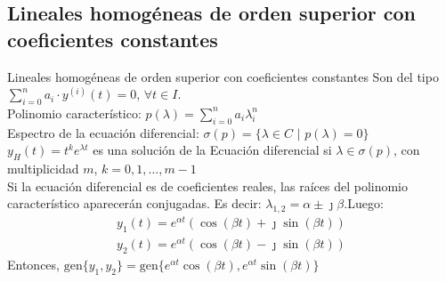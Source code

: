 \documentclass[a4paper, twoside]{article}
\numberwithin{equation}{section}
\numberwithin{figure}{section}
\numberwithin{table}{section}
\begin{document}
\subsection{Lineales homogéneas de orden superior con coeficientes constantes}
\begin{definicion*}{Lineales homogéneas de orden superior con coeficientes constantes}
	Son del tipo $\sum_{i=0}^n a_i \cdot y^{(i)}(t)=0$, $\forall t \in I$.\\
	
	Polinomio característico: $p(\lambda)=\sum_{i=0}^n a_i \lambda_i^n$\\
	
	Espectro de la ecuación diferencial: $\sigma(p)=\{ \lambda \in C$ $\vert$ $p(\lambda)=0 \}$\\
	
	$y_H(t)=t^k e^{\lambda t}$ es una solución de la Ecuación diferencial si $\lambda \in \sigma(p)$, con multiplicidad $m$, $k=0,1,\ldots,m-1$\\
	
	Si la ecuación diferencial es de coeficientes reales, las raíces del polinomio característico aparecerán conjugadas. Es decir: $\lambda_{1,2}=\alpha \pm \jmath \beta$.Luego:
	\begin{align*}
		y_1(t)=e^{\alpha t} \left(\cos (\beta t)+\jmath \sin (\beta t) \right) \\
		y_2(t)=e^{\alpha t} \left(\cos (\beta t)-\jmath \sin (\beta t) \right)
	\end{align*}
	Entonces, $\text{gen}\{ y_1,y_2\}=\text{gen} \{e^{\alpha t} \cos (\beta t),e^{\alpha t} \sin (\beta t) \}$
\end{definicion*}
\end{document}
